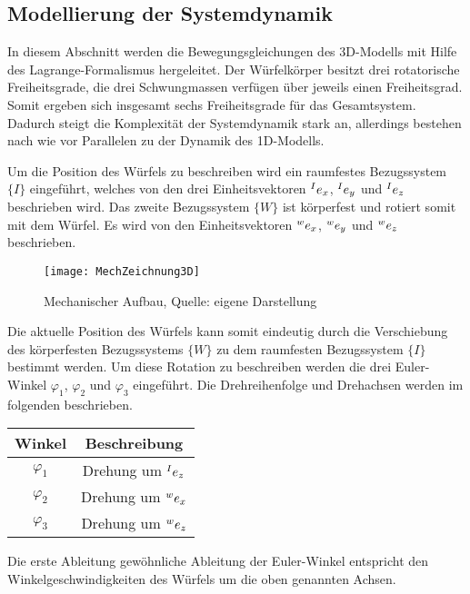 \subsection{Modellierung der Systemdynamik}
In diesem Abschnitt werden die Bewegungsgleichungen des 3D-Modells mit Hilfe des Lagrange-Formalismus hergeleitet. Der Würfelkörper besitzt drei rotatorische Freiheitsgrade, die drei Schwungmassen verfügen über jeweils einen Freiheitsgrad. Somit ergeben sich insgesamt sechs Freiheitsgrade für das Gesamtsystem. Dadurch steigt die Komplexität der Systemdynamik stark an, allerdings bestehen nach wie vor Parallelen zu der Dynamik des 1D-Modells.
\newline

Um die Position des Würfels zu beschreiben wird ein raumfestes Bezugssystem $\{I\}$ eingeführt, welches von den drei Einheitsvektoren $\prescript{I}{} e_x$, $\prescript{I}{} e_y$ und $\prescript{I}{} e_z$ beschrieben wird. Das zweite Bezugssystem $\{W\}$ ist körperfest und rotiert somit mit dem Würfel. Es wird von den Einheitsvektoren $\prescript{w}{} e_x$, $\prescript{w}{} e_y$ und $\prescript{w}{} e_z$ beschrieben.

\begin{figure}[h]
\centering
\texttt{[image: MechZeichnung3D]}
\caption{Mechanischer Aufbau, Quelle: eigene Darstellung}
\end{figure}

Die aktuelle Position des Würfels kann somit eindeutig durch die Verschiebung des körperfesten Bezugssystems $\{W\}$ zu dem raumfesten Bezugssystem $\{I\}$ bestimmt werden. Um diese Rotation zu beschreiben werden die drei Euler-Winkel $\varphi_1$, $\varphi_2$ und $\varphi_3$ eingeführt. Die Drehreihenfolge und Drehachsen werden im folgenden beschrieben.

\begin{table}[h]
\centering
\begin{tabular}{|c|c|}
\hline
\textbf{Winkel} & \textbf{Beschreibung} \\ \hline
$\varphi_1$ & Drehung um $\prescript{I}{} e_z$ \\ \hline
$\varphi_2$ & Drehung um $\prescript{w}{} e_x$  \\ \hline
$\varphi_3$ & Drehung um $\prescript{w}{} e_z$ \\ \hline
\end{tabular}
\end{table}

Die erste Ableitung gewöhnliche Ableitung der Euler-Winkel entspricht den Winkelgeschwindigkeiten des Würfels um die oben genannten Achsen.

